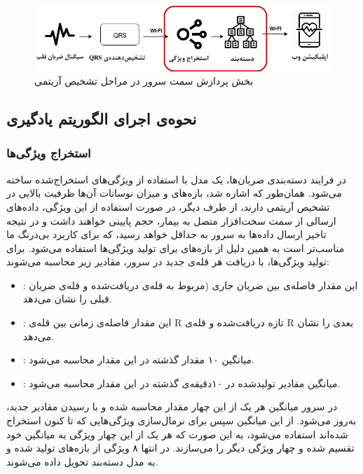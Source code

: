 \begin{figure}[!htb]
\centering
\includegraphics[width=16cm]{Figures/server.png}
\caption{بخش پردازش سمت سرور در مراحل تشخیص آریتمی}
\label{fig:server}
\end{figure}	
	

	\subsection{نحوه‌ی اجرای الگوریتم یادگیری}
		
		\subsubsection{استخراج ویژگی‌ها}
		در فرایند دسته‌بندی ضربان‌‌ها، یک مدل   با استفاده از ویژگی‌های استخراج‌شده ساخته می‌شود. همان‌طور که اشاره شد، بازه‌های  و میزان نوسانات آن‌ها ظرفیت بالایی در تشخیص آریتمی دارند، از طرف دیگر، در صورت استفاده از این ویژگی، داده‌های ارسالی از سمت سخت‌افزار متصل به بیمار، حجم پایینی خواهند داشت و در نتیجه تاخیر ارسال داده‌ها به سرور به حداقل خواهد رسید، که برای کاربرد بی‌درنگ ما مناسب‌تر است به همین دلیل از بازه‌های  برای تولید ویژگی‌ها استفاده می‌شود.
برای تولید ویژگی‌ها، با دریافت هر قله‌ی  جدید در سرور، مقادیر زیر محاسبه می‌شوند:
\begin{itemize}
	\item {}: این مقدار فاصله‌ی بین ضربان جاری (مربوط به قله‌ی  دریافت‌شده و قله‌ی ضربان قبلی را نشان می‌دهد.
	\item {}: این مقدار فاصله‌ی زمانی بین قله‌ی R تازه دریافت‌شده و قله‌ی R بعدی را نشان می‌دهد.
	\item {}: میانگین ۱۰ مقدار  گذشته در این مقدار محاسبه می‌شود.
	\item {}: میانگین مقادیر   تولیدشده در ۱۰دقیقه‌ی گذشته در این مقدار محاسبه می‌شود.
\end{itemize}

	در سرور میانگین هر یک از این چهار مقدار محاسبه شده و با رسیدن مقادیر جدید، به‌روز می‌شود. از این میانگین سپس برای نرمال‌سازی ویژگی‌هایی که تا کنون استخراج شده‌اند استفاده می‌شود، به این صورت که هر یک از این چهار ویژگی به میانگین خود تقسیم شده و چهار ویژگی دیگر را می‌سازند. در انتها ۸ ویژگی از بازه‌های  تولید شده و به مدل دسته‌بند تحویل داده می‌شوند.

